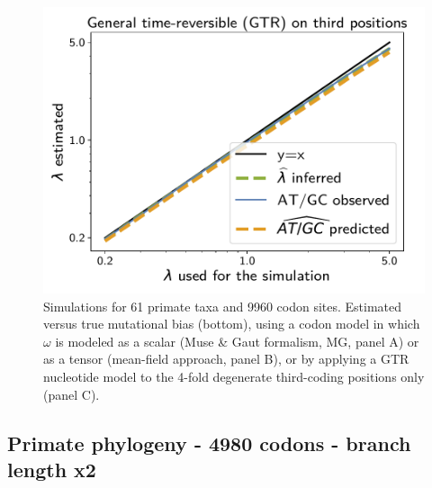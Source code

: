 \documentclass{article}
\begin{document}
\begin{figure}[!htb]
    \begin{minipage}{0.325\linewidth}
        \includegraphics[width=\linewidth, page=1]{inference_supp_mat/PrimatesExons20Mu1.0_lambda_GTR.pdf}
    \end{minipage}
    \hfill
    \caption[Estimation of mutational bias]{
        Simulations for 61 primate taxa and 9960 codon sites.
        Estimated versus true mutational bias (bottom), using a codon model in which $\omega$ is modeled as a scalar (Muse \& Gaut formalism, MG, panel A) or as a tensor (mean-field approach, panel B), or by applying a GTR nucleotide model to the 4-fold degenerate third-coding positions only (panel C).
    }
\end{figure}

\subsection{Primate phylogeny - 4980 codons - branch length x2}
\end{document}
